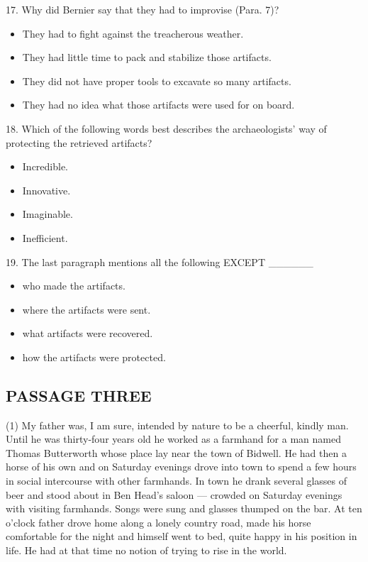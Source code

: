 \documentclass[UTF8,11pt]{ctexart}
\begin{document}
17. Why did Bernier say that they had to improvise (Para. 7)?


\begin{itemize}[leftmargin=2em,itemsep=.2em,topsep=.4em]\item[A.] They had to fight against the treacherous weather.
\item[B.] They had little time to pack and stabilize those artifacts.
\item[C.] They did not have proper tools to excavate so many artifacts.
\item[D.] They had no idea what those artifacts were used for on board.
\end{itemize}

18. Which of the following words best describes the archaeologists’ way of protecting the retrieved artifacts?


\begin{itemize}[leftmargin=2em,itemsep=.2em,topsep=.4em]\item[A.] Incredible.
\item[B.] Innovative.
\item[C.] Imaginable.
\item[D.] Inefficient.
\end{itemize}

19. The last paragraph mentions all the following EXCEPT \_\_\_\_\_\_


\begin{itemize}[leftmargin=2em,itemsep=.2em,topsep=.4em]\item[A.] who made the artifacts.
\item[B.] where the artifacts were sent.
\item[C.] what artifacts were recovered.
\item[D.] how the artifacts were protected.
\end{itemize}

\subsection*{\textbf{PASSAGE THREE}}


(1) My father was, I am sure, intended by nature to be a cheerful, kindly man. Until he was thirty-four years old he worked as a farmhand for a man named Thomas Butterworth whose place lay near the town of Bidwell. He had then a horse of his own and on Saturday evenings drove into town to spend a few hours in social intercourse with other farmhands. In town he drank several glasses of beer and stood about in Ben Head’s saloon — crowded on Saturday evenings with visiting farmhands. Songs were sung and glasses thumped on the bar. At ten o’clock father drove home along a lonely country road, made his horse comfortable for the night and himself went to bed, quite happy in his position in life. He had at that time no notion of trying to rise in the world.
\end{document}
